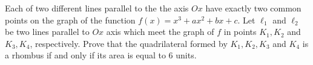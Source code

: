Each of two different lines parallel to the the axis $Ox$ have exactly two common points on the graph of the function $f(x)=x^3+ax^2+bx+c$. Let $\ell_1$ and $\ell_2$ be two lines parallel to $Ox$ axis which meet the graph of $f$ in points $K_1, K_2$ and $K_3, K_4$, respectively. Prove that the quadrilateral formed by $K_1, K_2, K_3$ and $ K_4$ is a rhombus if and only if its area is equal to $6$ units.
